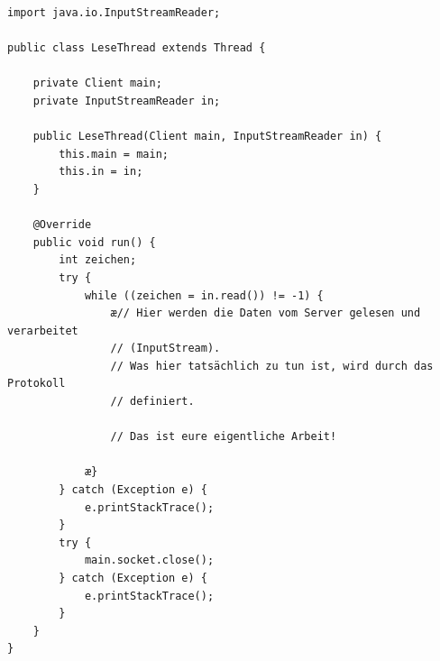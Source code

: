 \begin{lstlisting}
import java.io.InputStreamReader;

public class LeseThread extends Thread {

    private Client main;
    private InputStreamReader in;

    public LeseThread(Client main, InputStreamReader in) {
        this.main = main;
        this.in = in;
    }

    @Override
    public void run() {
        int zeichen;
        try {
            while ((zeichen = in.read()) != -1) {
                æ// Hier werden die Daten vom Server gelesen und verarbeitet
                // (InputStream).
                // Was hier tatsächlich zu tun ist, wird durch das Protokoll
                // definiert.

                // Das ist eure eigentliche Arbeit!

            æ}
        } catch (Exception e) {
            e.printStackTrace();
        }
        try {
            main.socket.close();
        } catch (Exception e) {
            e.printStackTrace();
        }
    }
}
\end{lstlisting}